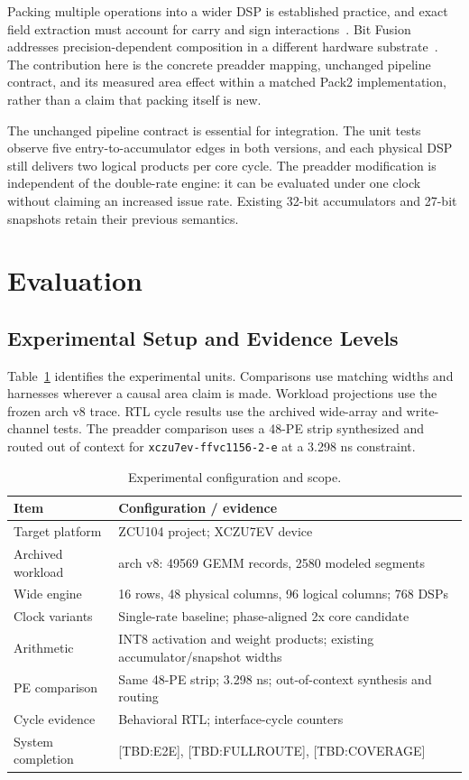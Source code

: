 \documentclass[10pt,conference,letterpaper]{IEEEtran}
\newcommand{\pending}[1]{\textcolor{red!65!black}{\textsf{[TBD:#1]}}}
\begin{document}
Packing multiple operations into a wider DSP is established practice, and exact field extraction must account for carry and sign interactions~\cite{packing}. Bit Fusion addresses precision-dependent composition in a different hardware substrate~\cite{bitfusion}. The contribution here is the concrete preadder mapping, unchanged pipeline contract, and its measured area effect within a matched Pack2 implementation, rather than a claim that packing itself is new.

The unchanged pipeline contract is essential for integration. The unit tests observe five entry-to-accumulator edges in both versions, and each physical DSP still delivers two logical products per core cycle. The preadder modification is independent of the double-rate engine: it can be evaluated under one clock without claiming an increased issue rate. Existing 32-bit accumulators and 27-bit snapshots retain their previous semantics.


\section{Evaluation}
\subsection{Experimental Setup and Evidence Levels}
Table~\ref{tab:setup} identifies the experimental units. Comparisons use matching widths and harnesses wherever a causal area claim is made. Workload projections use the frozen arch v8 trace. RTL cycle results use the archived wide-array and write-channel tests. The preadder comparison uses a 48-PE strip synthesized and routed out of context for \texttt{xczu7ev-ffvc1156-2-e} at a 3.298 ns constraint.

\begin{table}[t]\centering\caption{Experimental configuration and scope.}\label{tab:setup}
\begin{tabular}{p{}p{}}\toprule
Item & Configuration / evidence \\\midrule
Target platform & ZCU104 project; XCZU7EV device \\
Archived workload & arch v8: 49569 GEMM records, 2580 modeled segments \\
Wide engine & 16 rows, 48 physical columns, 96 logical columns; 768 DSPs \\
Clock variants & Single-rate baseline; phase-aligned 2x core candidate \\
Arithmetic & INT8 activation and weight products; existing accumulator/snapshot widths \\
PE comparison & Same 48-PE strip; 3.298 ns; out-of-context synthesis and routing \\
Cycle evidence & Behavioral RTL; interface-cycle counters \\
System completion & \pending{E2E}, \pending{FULLROUTE}, \pending{COVERAGE} \\\bottomrule
\end{tabular}\end{table}
\end{document}
